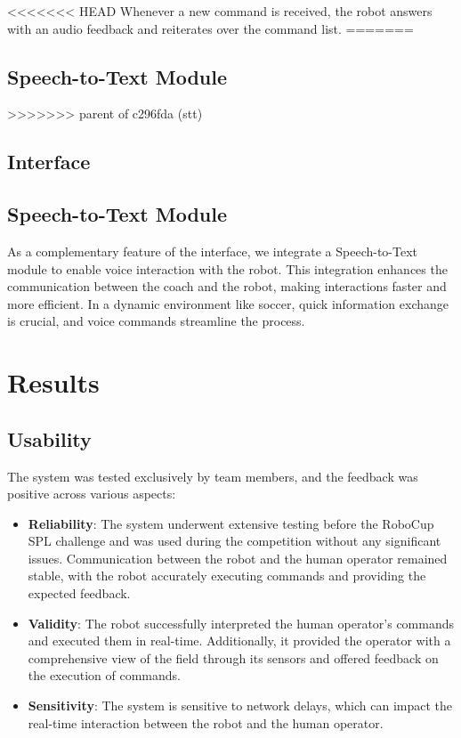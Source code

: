 \documentclass[a4paper, onecolumn, 12pt]{article}
\begin{document}
<<<<<<< HEAD
Whenever a new command is received, the robot answers with an audio feedback and
reiterates over the command list. 
=======



\subsection{Speech-to-Text Module}

>>>>>>> parent of c296fda (stt)

\subsection{Interface}

\subsection{Speech-to-Text Module}
As a complementary feature of the interface, we integrate a Speech-to-Text module to enable voice interaction with the robot. This integration enhances the communication between the coach and the robot, making interactions faster and more efficient. In a dynamic environment like soccer, quick information exchange is crucial, and voice commands streamline the process.


\section{Results}
\label{sec:res}
\subsection{Usability}  
The system was tested exclusively by team members, and the feedback was positive 
across various aspects:  
\begin{itemize}  
    \item \textbf{Reliability}: The system underwent extensive testing before the RoboCup 
    SPL challenge and was used during the competition without any significant issues. 
    Communication between the robot and the human operator remained stable, with the 
    robot accurately executing commands and providing the expected feedback.  
    \item \textbf{Validity}: The robot successfully interpreted the human operator's 
    commands and executed them in real-time. Additionally, it provided the operator with a comprehensive view of the field through its sensors and offered feedback on the execution of commands.  
    \item \textbf{Sensitivity}: The system is sensitive to network delays, which can 
    impact the real-time interaction between the robot and the human operator.  
\end{itemize}  
\end{document}
